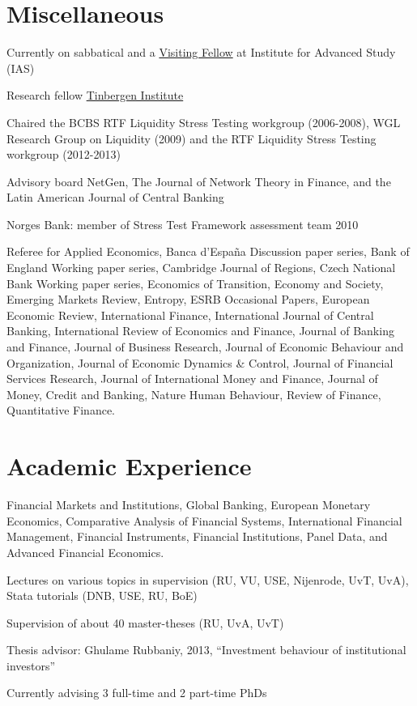 \documentclass[]{deedy-resume-reversed}
\begin{document}
\section{Miscellaneous}
\vspace{7pt}
\begin{tightemize}
\item Currently on sabbatical and a \href{https://ias.uva.nl/people/visiting-fellows/fellow-pages/lelyveld-iman-van.html?1570163475407}{Visiting Fellow} at Institute for Advanced Study (IAS)
\item Research fellow \href{https://www.tinbergen.nl/home}{Tinbergen Institute}
\item Chaired the BCBS RTF Liquidity Stress Testing workgroup (2006-2008), WGL Research Group on Liquidity (2009) and the RTF Liquidity Stress Testing workgroup (2012-2013)
\item Advisory board NetGen, The Journal of Network Theory in Finance, and the Latin American Journal of Central Banking
\item Norges Bank: member of Stress Test Framework assessment team 2010
\item Referee for Applied Economics, Banca d'España Discussion paper series, Bank of England Working paper series, Cambridge Journal of Regions, Czech National Bank Working paper series, Economics of Transition, Economy and Society, Emerging Markets Review, Entropy, ESRB Occasional Papers, European Economic Review, International Finance, International Journal of Central Banking, International Review of Economics and Finance, Journal of Banking and Finance, Journal of Business Research, Journal of Economic Behaviour and Organization, Journal of Economic Dynamics \& Control, Journal of Financial Services Research, Journal of International Money and Finance, Journal of Money, Credit and Banking, Nature Human Behaviour, Review of Finance, Quantitative Finance.
\end{tightemize}

\section{Academic Experience}
\vspace{5pt}
\begin{tightemize}
\item Financial Markets and Institutions, Global Banking, European Monetary Economics, Comparative Analysis of Financial Systems, International Financial Management, Financial Instruments, Financial Institutions, Panel Data, and Advanced Financial Economics.
\item Lectures on various topics in supervision (RU, VU, USE, Nijenrode, UvT, UvA), Stata tutorials (DNB, USE, RU, BoE)
\item Supervision of about 40 master-theses (RU, UvA, UvT)
\item Thesis advisor: Ghulame Rubbaniy, 2013, ``Investment behaviour of institutional investors''
\item Currently advising 3 full-time and 2 part-time PhDs
\end{tightemize}
\end{document}
